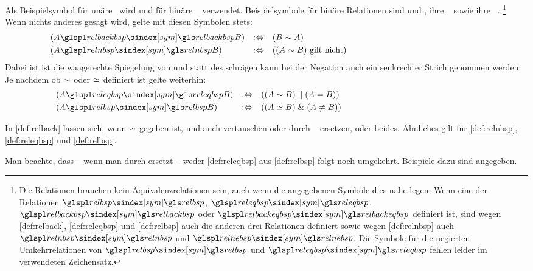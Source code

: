 Als Beispielsymbol für unäre \Operationen\ wird  und für binäre \Operationen\  verwendet.
Beispielsymbole für binäre Relationen sind  und , ihre   \textbzw\  sowie ihre   \textbzw\ .%
\footnote{%
	Die Relationen brauchen kein Äquivalenzrelationen sein, auch wenn die angegebenen Symbole dies nahe legen.
	Wenn eine der Relationen $\glsSym{relbsp}$, $\glsSym{releqbsp}$, $\glsSym{relbackbsp}$ oder $\glsSym{relbackeqbsp}$ definiert ist, sind wegen \eqref{def:relback}, \eqref{def:releqbsp} und \eqref{def:relbsp} auch die anderen drei Relationen definiert sowie wegen \eqref{def:relnbsp} auch $\glsSym{relnbsp}$ und $\glsSym{relnebsp}$.
	Die Symbole für die negierten Umkehrrelationen von $\glsSym{relbsp}$ und $\glsSym{releqbsp}$ fehlen leider im verwendeten Zeichensatz.
}
Wenn nichts anderes gesagt wird, gelte mit diesen Symbolen stets:
\begin{align}
	& (A \glsSym{relbackbsp}   B) & \metadefeq & \quad  (B \relbsp  A)
	\label{def:relback}   \\
	& (A \glsSym{relnbsp}  B)  & \metadefeq & \quad ((A \relbsp   B) \text{ gilt nicht})
	\label{def:relnbsp}    \formulatoleft\formulatoleft\formulatoleft
\end{align}
Dabei ist \chrqt{$\relbackbsp$} ist die waagerechte Spiegelung von \chrqt{$\relbsp$} und statt des schrägen kann bei der Negation auch ein senkrechter Strich genommen werden.
Je nachdem ob $\relbsp$ oder $\releqbsp$ definiert ist gelte weiterhin:
\begin{align}
	& (A \glsSym{releqbsp}  B) & \metadefeq & \quad ((A \relbsp   B) \metaor  (A \eq B))
	\label{def:releqbsp}   \\
	& (A \glsSym{relbsp} B)    & \metadefeq & \quad ((A \releqbsp B) \metaand (A \ne B))
	\label{def:relbsp}    \formulatoleft\formulatoleft\formulatoleft
\end{align}

In \eqref{def:relback} lassen sich, wenn $\relbackbsp$ gegeben ist, \chrqt{$\relbackbsp$} und \chrqt{$\relbsp$} auch vertauschen oder durch \chrqt{$\relbackeqbsp$} \textbzw\ \chrqt{$\releqbsp$} ersetzen, oder beides.
Ähnliches gilt für \eqref{def:relnbsp}, \eqref{def:releqbsp} und \eqref{def:relbsp}.

Man beachte, dass -- wenn man \chrqt{$\metadefeq$} durch \chrqt{$\metaequiv$} ersetzt -- weder \eqref{def:releqbsp} aus \eqref{def:relbsp} folgt noch umgekehrt.
Beispiele dazu sind  angegeben.

